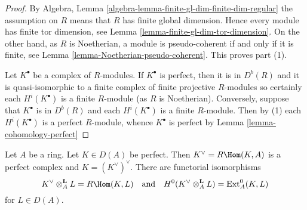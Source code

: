\begin{proof}
By
Algebra, Lemma \ref{algebra-lemma-finite-gl-dim-finite-dim-regular}
the assumption on $R$ means that $R$ has finite global dimension.
Hence every module has finite tor dimension, see
Lemma \ref{lemma-finite-gl-dim-tor-dimension}.
On the other hand, as $R$ is Noetherian, a module is pseudo-coherent
if and only if it is finite, see
Lemma \ref{lemma-Noetherian-pseudo-coherent}.
This proves part (1).

\medskip\noindent
Let $K^\bullet$ be a complex of $R$-modules.
If $K^\bullet$ is perfect, then it is in $D^b(R)$ and it is
quasi-isomorphic to a finite complex of finite projective $R$-modules
so certainly each $H^i(K^\bullet)$ is a finite $R$-module (as $R$ is
Noetherian). Conversely, suppose that $K^\bullet$ is in $D^b(R)$
and each $H^i(K^\bullet)$ is a finite $R$-module. Then by (1) each
$H^i(K^\bullet)$ is a perfect $R$-module, whence $K^\bullet$ is
perfect by
Lemma \ref{lemma-cohomology-perfect}
\end{proof}

\begin{lemma}
\label{lemma-dual-perfect-complex}
Let $A$ be a ring. Let $K \in D(A)$ be perfect. Then $K^\vee = R\Hom(K, A)$
is a perfect complex and $K = (K^\vee)^\vee$. There are functorial
isomorphisms
$$
K^\vee \otimes_A^\mathbf{L} L = R\Hom(K, L)
\quad\text{and}\quad
H^0(K^\vee \otimes_A^\mathbf{L} L) = \text{Ext}_A^0(K, L)
$$
for $L \in D(A)$.
\end{lemma}

